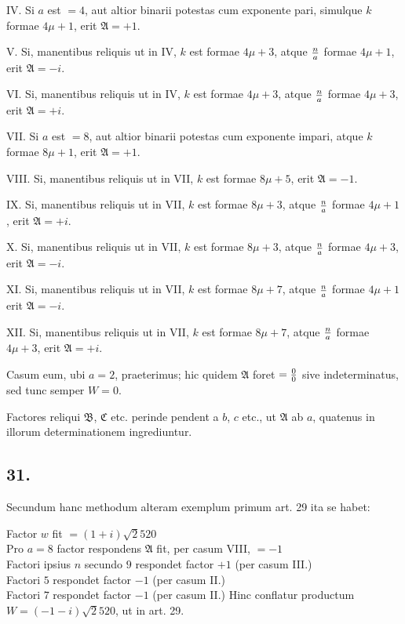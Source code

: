 \documentclass[twoside,12pt, showframe]{memoir}
\renewenvironment{quote}%
  {\list{}{\leftmargin=5em\rightmargin=0em}\item[]}%
  {\endlist}
\let\oldfrac\frac
\def\frac#1#2{\mathchoice{\tfrac{#1}{#2}}{\oldfrac{#1}{#2}}{\genfrac{}{}{}{2}{#1}{#2\mathstrut}}{\genfrac{}{}{}{3}{#1}{#2\mathstrut}}}
\begin{document}
IV. Si \(a\) est \(=4\), aut altior binarii potestas cum exponente pari, simulque \(k\) formae \(4 \mu+1\), erit \(\mathfrak{A}=+1\).
 
V. Si, manentibus reliquis ut in IV, \(k\) est formae \(4 \mu+3\), atque \(\frac{n}{a}\) formae \(4 \mu+1\), erit \(\mathfrak{A}=-i\).
 
VI. Si, manentibus reliquis ut in IV, \(k\) est formae \(4 \mu+3\), atque \(\frac{n}{a}\) formae \(4 \mu+3\), erit \(\mathfrak{A}=+i\).
 
VII. Si \(a\) est \(=8\), aut altior binarii potestas cum exponente impari, atque \(k\) formae \(8 \mu+1\), erit \(\mathfrak{A}=+1\).
 
VIII. Si, manentibus reliquis ut in VII, \(k\) est formae \(8 \mu+5\), erit \(\mathfrak{A}=-1\).
 
IX. Si, manentibus reliquis ut in VII, \(k\) est formae \(8 \mu+3\), atque \(\frac{n}{a}\) formae \(4 \mu+1\), erit \(\mathfrak{A}=+i\).\clearpage\noindent%
 
X. Si, manentibus reliquis ut in VII, \(k\) est formae \(8 \mu+3\), atque \(\frac{n}{a}\) formae \(4 \mu+3\), erit \(\mathfrak{A}=-i\).
 
XI. Si, manentibus reliquis ut in VII, \(k\) est formae \(8 \mu+7\), atque \(\frac{n}{a}\) formae \(4 \mu+1\) erit \(\mathfrak{A}=-i\).
 
XII. Si, manentibus reliquis ut in VII, \(k\) est formae \(8 \mu+7\), atque \(\frac{n}{a}\) formae \(4 \mu+3\), erit \(\mathfrak{A}=+i\).
 
Casum eum, ubi \(a=2\), praeterimus; hic quidem \(\mathfrak{A}\) foret \(=\frac{0}{0}\) sive indeterminatus, sed tunc semper \(W=0\).
 
Factores reliqui \(\mathfrak{B}\), \(\mathfrak{C}\) etc. perinde pendent a \(b\), \(c\) etc., ut \(\mathfrak{A}\) ab \(a\), quatenus in illorum determinationem ingrediuntur.

\subsection*{31.}
 
Secundum hanc methodum alteram exemplum primum art. 29 ita se habet:
\begin{quote}Factor \(w\) fit \(=(1+i) \surd 2520\)\\
Pro \(a=8\) factor respondens \(\mathfrak{A}\) fit, per casum VIII, \(=-1\)\\
Factori ipsius \(n\) secundo \(9\) respondet factor \(+1\) (per casum III.)\\
Factori \(5\) respondet factor \(-1\) (per casum II.)\\
Factori \(7\) respondet factor \(-1\) (per casum II.)\end{quote}
Hinc conflatur productum \(W=(-1-i) \surd 2520\), ut in art. 29.
\end{document}
